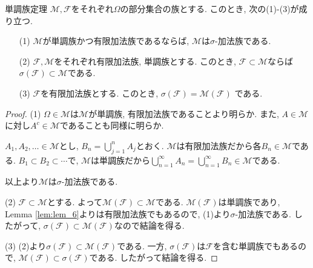 \begin{theorem}{単調族定理}{}
    $\mathcal{M},\mathcal{F}$をそれぞれ$\Omega$の部分集合の族とする.
    このとき, 次の(1)-(3)が成り立つ.
    \begin{itemize}
        \item[(1)] $\mathcal{M}$が単調族かつ有限加法族であるならば, $\mathcal{M}$は$\sigma$-加法族である.
        \item[(2)] $\mathcal{F},\mathcal{M}$をそれぞれ有限加法族, 単調族とする.
            このとき, $\mathcal{F}\subset\mathcal{M}$ならば$\sigma(\mathcal{F})\subset\mathcal{M}$である.
        \item[(3)] $\mathcal{F}$を有限加法族とする.
            このとき, $\sigma(\mathcal{F})=\mathcal{M}(\mathcal{F})$ である.
    \end{itemize}
\end{theorem}
\begin{proof}
    (1) $\Omega\in\mathcal{M}$は$\mathcal{M}$が単調族, 有限加法族であることより明らか.
    また, $A\in\mathcal{M}$に対し$A^c\in\mathcal{M}$であることも同様に明らか.

    $A_1,A_2,\dots\in\mathcal{M}$とし, $B_n=\bigcup_{j=1}^n A_j$とおく.
    $\mathcal{M}$は有限加法族だから各$B_n\in\mathcal{M}$である.
    $B_1\subset B_2\subset\cdots$で, $\mathcal{M}$は単調族だから$\bigcup_{n=1}^\infty A_n=\bigcup_{n=1}^\infty B_n\in\mathcal{M}$である.

    以上より$\mathcal{M}$は$\sigma$-加法族である.

    (2) $\mathcal{F}\subset\mathcal{M}$とする.
    よって$\mathcal{M}(\mathcal{F})\subset\mathcal{M}$である.
    $\mathcal{M}(\mathcal{F})$は単調族であり, Lemma \ref{lem:lem_6}よりは有限加法族でもあるので, (1)より$\sigma$-加法族である.
    したがって, $\sigma(\mathcal{F})\subset\mathcal{M}(\mathcal{F})$なので結論を得る.

    (3) (2)より$\sigma(\mathcal{F})\subset\mathcal{M}(\mathcal{F})$である.
    一方, $\sigma(\mathcal{F})$は$\mathcal{F}$を含む単調族でもあるので, $\mathcal{M}(\mathcal{F})\subset\sigma(\mathcal{F})$である.
    したがって結論を得る.
\end{proof}


